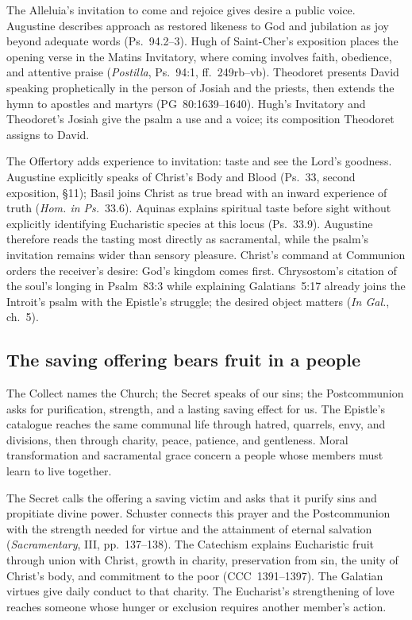 The Alleluia's invitation to come and rejoice gives desire a public voice.
Augustine describes approach as restored likeness to God and jubilation as
joy beyond adequate words (Ps.~94.2--3). Hugh of Saint-Cher's exposition places
the opening verse in the Matins Invitatory, where coming involves faith,
obedience, and attentive praise (\emph{Postilla}, Ps.~94:1, ff.~249rb--vb).
Theodoret presents David speaking prophetically in the person of Josiah and
the priests, then extends the hymn to apostles and martyrs
(PG~80:1639--1640). Hugh's Invitatory and Theodoret's Josiah give the psalm a
use and a voice; its composition Theodoret assigns to David.

The Offertory adds experience to invitation: taste and see the Lord's
goodness. Augustine explicitly speaks of Christ's Body and Blood (Ps.~33,
second exposition, §11); Basil joins Christ as true bread with an inward
experience of truth (\emph{Hom. in Ps.}~33.6). Aquinas explains spiritual taste
before sight without explicitly identifying Eucharistic species at this locus
(Ps.~33.9). Augustine therefore reads the tasting most directly as sacramental,
while the psalm's invitation remains wider than sensory pleasure.
Christ's command at Communion orders the receiver's desire: God's kingdom
comes first. Chrysostom's citation of the soul's longing in Psalm~83:3 while
explaining Galatians~5:17 already joins the Introit's psalm with the Epistle's
struggle; the desired object matters (\emph{In Gal.}, ch.~5).

\subsection*{The saving offering bears fruit in a people\enspace{}}

The Collect names the Church; the Secret speaks of our sins; the
Postcommunion asks for purification, strength, and a lasting saving effect
for us. The Epistle's catalogue reaches the same communal life through
hatred, quarrels, envy, and divisions, then through charity, peace, patience,
and gentleness. Moral transformation and sacramental grace concern a people
whose members must learn to live together.

The Secret calls the offering a saving victim and asks that it purify sins
and propitiate divine power. Schuster connects this prayer and the
Postcommunion with the strength needed for virtue and the attainment of
eternal salvation (\emph{Sacramentary}, III, pp.~137--138). The Catechism
explains Eucharistic fruit through union with Christ, growth in charity,
preservation from sin, the unity of Christ's body, and commitment to the poor
(CCC~1391--1397). The Galatian virtues give daily conduct to that charity.
The Eucharist's strengthening of love reaches someone whose hunger or
exclusion requires another member's action.

